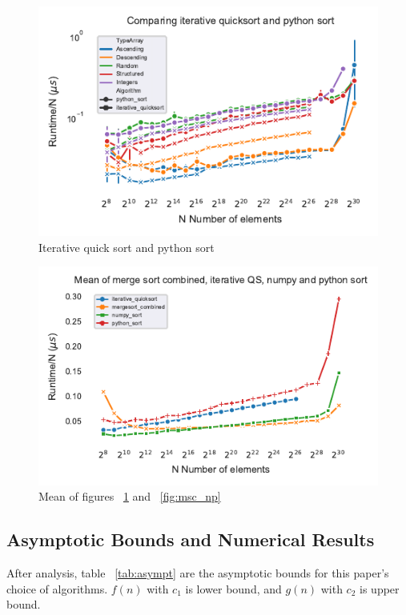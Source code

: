 \documentclass[sigconf, nonacm, natbib, screen, balance=False]{acmart}
\begin{document}
\begin{figure}[]
  \centering
  \includegraphics[scale=0.9]{runtime_per_n_iterqs&py.pdf}
  \caption{Iterative quick sort and python sort}
  \label{fig:iqs_ps}
\end{figure}

\begin{figure}[]
  \centering
  \includegraphics[scale=0.9]{mean_runtime_per_n_combined&np&py.pdf}
  \caption{Mean of figures ~\ref{fig:iqs_ps} and ~\ref{fig:msc_np}}
  \label{fig:mean_np_py_mergecomb}
\end{figure}

\subsection{Asymptotic Bounds and Numerical Results}\label{sec:results_comp}
After analysis, table ~\ref{tab:asympt} are the asymptotic bounds for this paper's choice of algorithms. $f(n)$ with $c_1$ is lower bound, and $g(n)$ with $c_2$ is upper bound. 
\end{document}
